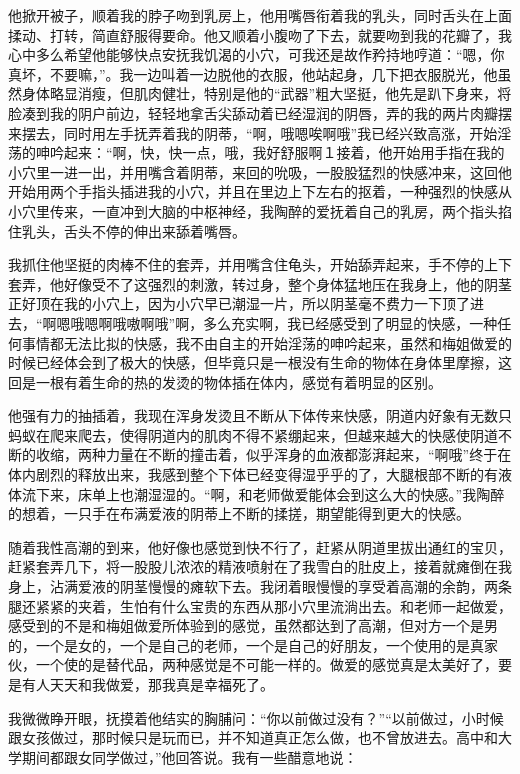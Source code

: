 \documentclass[12pt,UTF8]{ctexbook}
\begin{document}
他掀开被子，顺着我的脖子吻到乳房上，他用嘴唇衔着我的乳头，同时舌头在上面揉动、打转，简直舒服得要命。他又顺着小腹吻了下去，就要吻到我的花瓣了，我心中多么希望他能够快点安抚我饥渴的小穴，可我还是故作矜持地哼道：“嗯，你真坏，不要嘛，”。我一边叫着一边脱他的衣服，他站起身，几下把衣服脱光，他虽然身体略显消瘦，但肌肉健壮，特别是他的“武器”粗大坚挺，他先是趴下身来，将脸凑到我的阴户前边，轻轻地拿舌尖舔动着已经湿润的阴唇，弄的我的两片肉瓣摆来摆去，同时用左手抚弄着我的阴蒂，“啊，哦嗯唉啊哦”我已经兴致高涨，开始淫荡的呻吟起来：“啊，快，快一点，哦，我好舒服啊１接着，他开始用手指在我的小穴里一进一出，并用嘴含着阴蒂，来回的吮吸，一股股猛烈的快感冲来，这回他开始用两个手指头插进我的小穴，并且在里边上下左右的抠着，一种强烈的快感从小穴里传来，一直冲到大脑的中枢神经，我陶醉的爱抚着自己的乳房，两个指头掐住乳头，舌头不停的伸出来舔着嘴唇。

我抓住他坚挺的肉棒不住的套弄，并用嘴含住龟头，开始舔弄起来，手不停的上下套弄，他好像受不了这强烈的刺激，转过身，整个身体猛地压在我身上，他的阴茎正好顶在我的小穴上，因为小穴早已潮湿一片，所以阴茎毫不费力一下顶了进去，“啊嗯哦嗯啊哦嗷啊哦”啊，多么充实啊，我已经感受到了明显的快感，一种任何事情都无法比拟的快感，我不由自主的开始淫荡的呻吟起来，虽然和梅姐做爱的时候已经体会到了极大的快感，但毕竟只是一根没有生命的物体在身体里摩擦，这回是一根有着生命的热的发烫的物体插在体内，感觉有着明显的区别。

他强有力的抽插着，我现在浑身发烫且不断从下体传来快感，阴道内好象有无数只蚂蚁在爬来爬去，使得阴道内的肌肉不得不紧绷起来，但越来越大的快感使阴道不断的收缩，两种力量在不断的撞击着，似乎浑身的血液都澎湃起来，“啊哦”终于在体内剧烈的释放出来，我感到整个下体已经变得湿乎乎的了，大腿根部不断的有液体流下来，床单上也潮湿湿的。“啊，和老师做爱能体会到这么大的快感。”我陶醉的想着，一只手在布满爱液的阴蒂上不断的揉搓，期望能得到更大的快感。

随着我性高潮的到来，他好像也感觉到快不行了，赶紧从阴道里拔出通红的宝贝，赶紧套弄几下，将一股股儿浓浓的精液喷射在了我雪白的肚皮上，接着就瘫倒在我身上，沾满爱液的阴茎慢慢的瘫软下去。我闭着眼慢慢的享受着高潮的余韵，两条腿还紧紧的夹着，生怕有什么宝贵的东西从那小穴里流淌出去。和老师一起做爱，感受到的不是和梅姐做爱所体验到的感觉，虽然都达到了高潮，但对方一个是男的，一个是女的，一个是自己的老师，一个是自己的好朋友，一个使用的是真家伙，一个使的是替代品，两种感觉是不可能一样的。做爱的感觉真是太美好了，要是有人天天和我做爱，那我真是幸福死了。

我微微睁开眼，抚摸着他结实的胸脯问：“你以前做过没有？”“以前做过，小时候跟女孩做过，那时候只是玩而已，并不知道真正怎么做，也不曾放进去。高中和大学期间都跟女同学做过，”他回答说。我有一些醋意地说：
\end{document}
